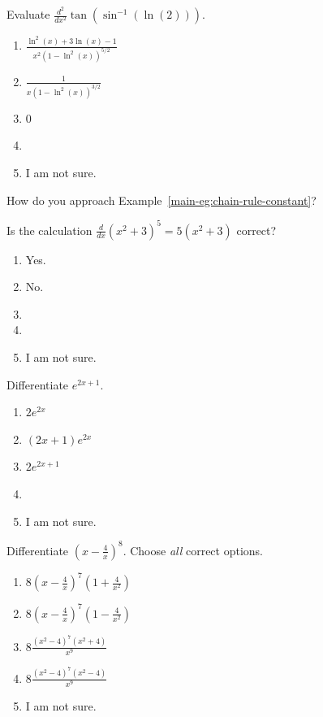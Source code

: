 \documentclass[aspectratio=169, 14pt, t]{beamer}  %
\begin{document}
\begin{poll}
  Evaluate \(\frac{d^{2}}{dx^{2}} \tan\left( \sin^{-1}(\ln(2))\right)\).

  \begin{enumerate}
    \item \(\frac{\ln^{2}(x) + 3 \ln(x) - 1}{x^{2} \left( 1 - \ln^{2}(x) \right)^{5/2}}\)
    \item \(\frac{1}{x \left( 1 - \ln^{2}(x) \right)^{3/2}}\)
    \item \(0\)
    \item
    \item I am not sure.
  \end{enumerate}
\end{poll}

\begin{poll}[c]
  How do you approach Example~\ref{main-eg:chain-rule-constant}?
\end{poll}

\begin{poll}
  Is the calculation \(\frac{d}{dx} (x^{2} + 3)^{5} = 5 (x^{2} + 3)\) correct?

  \begin{enumerate}
    \item Yes.
    \item No.
    \item
    \item
    \item I am not sure.
  \end{enumerate}
\end{poll}

\begin{poll}
  Differentiate \(e^{2x + 1}\).

  \begin{enumerate}
    \item \(2e^{2x}\)
    \item \((2x+1)e^{2x}\)
    \item \(2e^{2x+1}\)
    \item
    \item I am not sure.
  \end{enumerate}
\end{poll}

\begin{poll}
  Differentiate \((x - \frac{4}{x})^{8}\). Choose \emph{all} correct options.

  \begin{enumerate}
    \item \(8 \left( x - \frac{4}{x} \right)^{7}(1 + \frac{4}{x^{2}})\)
    \item \(8 \left( x - \frac{4}{x} \right)^{7}(1 - \frac{4}{x^{2}})\)
    \item \(8 \frac{(x^{2} - 4)^{7}(x^{2}+4)}{x^{9}}\)
    \item \(8 \frac{(x^{2} - 4)^{7}(x^{2}-4)}{x^{9}}\)
    \item I am not sure.
  \end{enumerate}
\end{poll}
\end{document}
